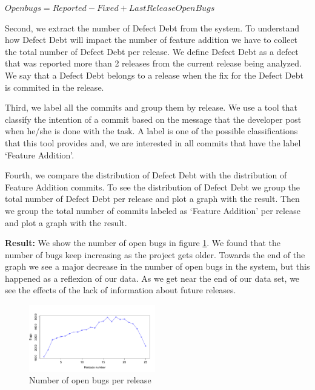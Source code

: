 \begin{center}
	$Open bugs=  Reported - Fixed + Last Release OpenBugs$
\end{center}

Second, we extract the number of  Defect Debt from the system. To understand how Defect Debt will impact the number of feature addition we have to collect the total number of Defect Debt per release. We define Defect Debt as a defect that was reported more than 2 releases from the current release being analyzed. We say that a Defect Debt belongs to a release when the fix for the Defect Debt is commited in the release.
 
Third, we label all the commits and group them by release. We use a tool that classify the intention of a commit based on the message that the developer post when he/she is done with the task. A label is one of the possible classifications that this tool provides and, we are interested in all commits that have the label `Feature Addition'.   

Fourth, we compare the distribution of Defect Debt with the distribution of Feature Addition commits. To see the distribution of Defect Debt we group the total number of Defect Debt per release and plot a graph with the result. Then we group the total number of commits labeled as `Feature Addition' per release and plot a graph with the result.

\vspace{1mm}
\noindent\textbf{Result:} We show the number of open bugs in figure \ref{fig:number_of_bugs_releases}. We found that the number of bugs keep increasing as the project gets older. Towards the end of the graph we see a major decrease in the number of open bugs in the system, but this happened as a reflexion of our data. As we get near the end of our data set, we see the effects of the lack of information about future releases. 

\begin{figure}[thb!]
	\caption{Number of open bugs per release}
	\label{fig:number_of_bugs_releases}
	\includegraphics[width=0.49\textwidth]{figures/number_of_bugs_releases}
\end{figure}
  
